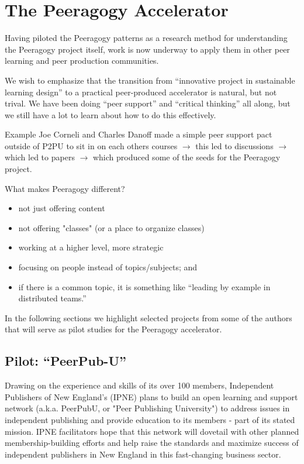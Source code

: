 \documentclass{acm_proc_article-sp}
\begin{document}
\section{The Peeragogy Accelerator} \label{accelerator}

Having piloted the Peeragogy patterns as a research method for
understanding the Peeragogy project itself, work is now underway to
apply them in other peer learning and peer production communities.

We wish to emphasize that the transition from ``innovative project in sustainable learning design'' to a practical peer-produced accelerator is natural, but not trival. We have been doing ``peer
support'' and ``critical thinking'' all along, but we still have a lot to learn about how to do this effectively.

\begin{paragraph}{Example}
Joe Corneli and Charles Danoff made a simple peer support pact outside of P2PU to sit
in on each others courses $\rightarrow$ this led to discussions $\rightarrow$ which led to papers $\rightarrow$ which produced some of the seeds for the Peeragogy project.
\end{paragraph}

\begin{paragraph}{What makes Peeragogy different?}
\begin{itemize}
\item not just offering content
\item not offering "classes" (or a place to organize classes)
\item working at a higher level, more strategic
\item focusing on people instead of topics/subjects; and
\item if there is a common topic, it is something like ``leading by example in distributed teams.''
\end{itemize}
\end{paragraph}

In the following sections we highlight selected projects from some of the authors that will serve as pilot studies for the Peeragogy accelerator.

\subsection{Pilot: ``PeerPub-U''}

Drawing on the experience and skills of its over 100 members, Independent
Publishers of New England's (IPNE) plans to build an open learning and support network (a.k.a. PeerPubU, or "Peer Publishing University") to address issues in independent publishing and provide education to its members - part of its stated mission. IPNE facilitators hope that this network will dovetail with other planned membership-building efforts and help raise the standards and maximize success of independent publishers in New England in this fast-changing business sector.
\end{document}
